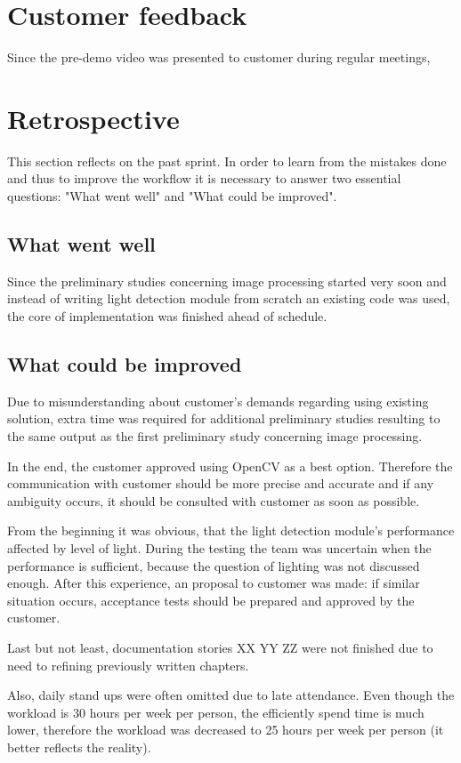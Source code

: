 \section{Customer feedback}
Since the pre-demo video was presented to customer during regular meetings, 

\section{Retrospective}
This section reflects on the past sprint. In order to learn from the mistakes done and thus to improve the workflow it is necessary to answer two essential questions: "What went well" and "What could be improved".

\subsection{What went well}
Since the preliminary studies concerning image processing started very soon and instead of writing light detection module from scratch an existing code was used, the core of implementation was finished ahead of schedule.

\subsection{What could be improved}
Due to misunderstanding about customer's demands regarding using existing solution, extra time was required for additional preliminary studies resulting to the same output as the first preliminary study concerning image processing. 

In the end, the customer approved using OpenCV as a best option.
Therefore the communication with customer should be more precise and accurate and if any ambiguity occurs, it should be consulted with customer as soon as possible.

From the beginning it was obvious, that the light detection module's performance affected by level of light.
During the testing the team was uncertain when the performance is sufficient, because the question of lighting was not discussed enough.
After this experience, an proposal to customer was made: if similar situation occurs, acceptance tests should be prepared and approved by the customer.

Last but not least, documentation stories XX YY ZZ were not finished due to need to refining previously written chapters.

Also, daily stand ups were often omitted due to late attendance.
Even though the workload is 30 hours per week per person, the efficiently spend time is much lower, therefore the workload was decreased to 25 hours per week per person (it better reflects the reality).
